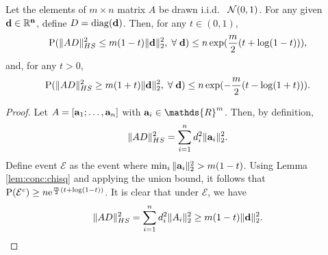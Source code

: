 \documentclass[onecolumn]{IEEEtran}
\newcommand{\av}{{\bf a}}
\begin{document}
%


\begin{lemma}\label{lem:lowedbound:AD}
Let the elements of $m\times n$ matrix $A$ be drawn  i.i.d.~ $\Nc(0,1)$. For any given $\bf{d} \in \mathbb{R}^n$, define $D = \diag (\bf{d})$. Then, for any $t\in(0,1)$,
\[
\P(\|A D\|^2_{HS} \leq m (1-t) \| {\bf d}\|_2^2, \;\forall \; {\bf d}) \leq n \exp(\frac{m}{2} (t + \log (1- t))), 
\]
and, for any $t>0$,
\[
\P(\|A D\|^2_{HS} \geq m (1+t) \| {\bf d}\|_2^2,  \;\forall \; {\bf d}) \leq n \exp(-\frac{m}{2} (t - \log (1+ t))).
\]
 \end{lemma}
\begin{proof}
Let $A=[\av_1;\ldots,\av_n]$ with $\av_i\in\mathds{R}^m$. Then, by definition, 
\begin{equation}\label{eq:lemma}
\|A D\|^2_{HS} = \sum_{i=1}^n d_i^2 \|\av_i\|_2^2. 
\end{equation}
Define event $\mathcal{E}$ as the event where $\min_i \|\av_i\|_2^2 > m(1- t)$. Using Lemma \ref{lem:conc:chisq} and applying the union bound, it follows that $\P(\mathcal{E}^c)  \geq n  {\rm e}^{\frac{m}{2} (t + \log (1- t)) }$. It is clear that under $\mathcal{E}$, we have
\[
\|A D\|^2_{HS} = \sum_{i=1}^n d_i^2 \|A_i\|_2^2 \geq m(1-t) \| {\bf d}\|_2^2. 
\]
\end{proof}

\end{document}
